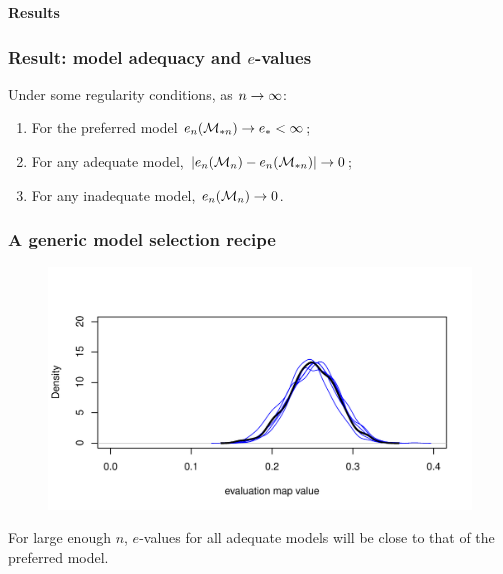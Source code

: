 \documentclass[handout,10pt]{beamer}
\begin{document}

%
\begin{frame}
\centering\huge
\textcolor{UniBlue}{\textbf{Results}}
\end{frame}


\begin{frame}
\frametitle{Result: model adequacy and $e$-values}

\begin{theorem}
Under some regularity conditions, as $n \rightarrow \infty$:
%
\begin{enumerate}
\item For the preferred model $e_n ({\cal{M}}_{* n} ) \rightarrow e_*< \infty$;
\item For any adequate model, $| e_n ({\cal{M}}_n ) - e_n ({\cal{M}}_{* n} ) | \rightarrow 0$;
\item For any inadequate model, $ e_n ({\cal{M}}_n ) \rightarrow 0$.
\end{enumerate}
\end{theorem}
\end{frame}


\begin{frame}
\frametitle{A generic model selection recipe}

\begin{figure}
\centering
\includegraphics[width=.9\textwidth]{fullplot1}
\end{figure}
For large enough $n$, $e$-values for all adequate models will be close to that of the preferred model.

\end{frame}

\end{document}
